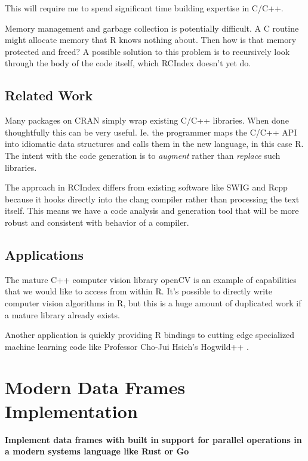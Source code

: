 \documentclass[12pt]{article}
\begin{document}
This will require me to spend significant time building expertise in C/C++.

Memory management and garbage collection is potentially difficult. A C
routine might allocate memory that R knows nothing about. Then how is that
memory protected and freed? A possible solution to this problem is to
recursively look
through the body of the code itself, which RCIndex doesn't yet do.

\subsection{Related Work}

Many packages on CRAN simply wrap existing C/C++ libraries. When done
thoughtfully this can be very useful. Ie. the programmer maps the C/C++ API
into idiomatic data structures and calls them in the new language, in this
case R.  The intent with the code generation is to \emph{augment} rather
than \emph{replace} such libraries. 

The approach in RCIndex differs from existing software like SWIG
\cite{swig} and Rcpp \cite{R-Rcpp} because it hooks directly into the clang
compiler rather than processing the text itself. This means we have a code
analysis and generation tool that will be more robust and consistent with
behavior of a compiler. 

\subsection{Applications}

The mature C++ computer vision library openCV
\cite{opencv_library} is an example of capabilities that we would like to
access from within R. It's possible to directly write computer vision
algorithms in R, but this is a huge amount of duplicated work if a mature
library already exists.

Another application is quickly providing R bindings to cutting edge
specialized machine learning code like Professor Cho-Jui Hsieh's Hogwild++
\cite{zhang2016hogwild}.

\section{Modern Data Frames Implementation}

\textbf{Implement data frames with built in support for parallel operations
in a modern systems language like Rust or Go}
\end{document}
